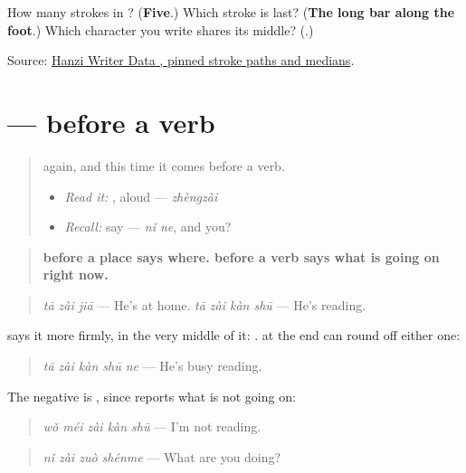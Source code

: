 \begin{tcolorbox}[breakable,colback=teal!4,colframe=teal!35!black,title={Before you move on}]
How many strokes in ? (\textbf{Five}.) Which stroke is last? (\textbf{The long bar along the foot}.) Which character you write shares its middle? (\textbf{}.)

Source: \href{https://raw.githubusercontent.com/chanind/hanzi-writer-data/68d10a4b21150cae5e1ebbd223eed289cf32d90c/data/\%E6\%AD\%A3.json}{Hanzi Writer Data , pinned stroke paths and medians}.
\end{tcolorbox}
\section[\texorpdfstring{\zh{你在做什么} (nǐ zài zuò shénme)}{你在做什么 (nǐ zài zuò shénme)}]{ —  before a verb}

\label{lesson:ZH-C149-zai-progressive}



\begin{quote}
 again, and this time it comes before a verb.

\begin{itemize}
\raggedright
  \item \emph{Read it:} , aloud — \emph{zhèngzài}
  \item \emph{Recall:} say  — \emph{nǐ ne}, and you?
\end{itemize}
\end{quote}

\begin{grammarlens}[title={Grammar Lens: \zh{在} before a place, \zh{在} before a verb}]
\begin{quote}
\textbf{ before a place says where.  before a verb says what is going on right now.}
\end{quote}

\begin{quote}
\textbf{} \emph{tā zài jiā} — He's at home. \textbf{} \emph{tā zài kàn shū} — He's reading.
\end{quote}

 says it more firmly, in the very middle of it: .  at the end can round off either one:

\begin{quote}
\textbf{} \emph{tā zài kàn shū ne} — He's busy reading.
\end{quote}

The negative is , since  reports what is not going on:

\begin{quote}
\textbf{} \emph{wǒ méi zài kàn shū} — I'm not reading.
\end{quote}

\begin{quote}
\textbf{} \emph{nǐ zài zuò shénme} — What are you doing?
\end{quote}
\end{grammarlens}


